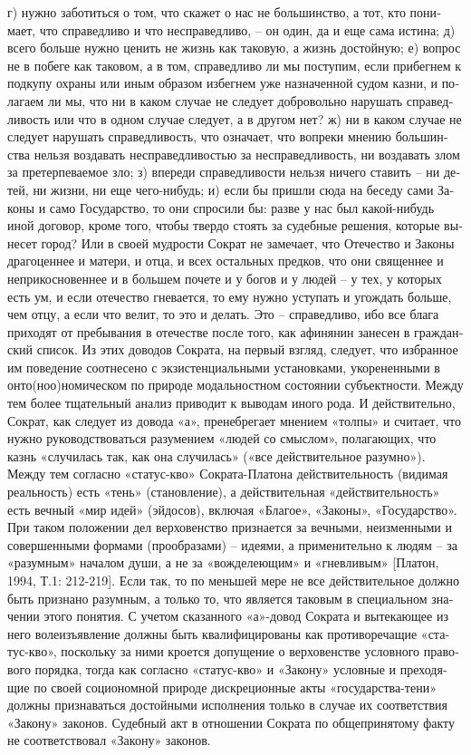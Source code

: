 \begin{russian}
    г) нужно заботиться о том, что скажет о нас не большинство, а тот, кто понимает, что справедливо и что несправедливо, – он один, да и еще сама истина;
    д) всего больше нужно ценить не жизнь как таковую, а жизнь достойную;
    е) вопрос не в побеге как таковом, а в том, справедливо ли мы поступим, если прибегнем к подкупу охраны или иным образом избегнем уже назначенной судом казни, и полагаем ли мы, что ни в каком случае не следует добровольно нарушать справедливость или что в одном случае следует, а в другом нет?
    ж) ни в каком случае не следует нарушать справедливость, что означает, что вопреки мнению большинства нельзя воздавать несправедливостью за несправедливость, ни воздавать злом за претерпеваемое зло;
    з) впереди справедливости нельзя ничего ставить – ни детей, ни жизни, ни еще чего-нибудь;
    и) если бы пришли сюда на беседу сами Законы и само Государство, то они спросили бы: разве у нас был какой-нибудь иной договор, кроме того, чтобы твердо стоять за судебные решения, которые вынесет город? Или в своей мудрости  Сократ не замечает, что Отечество и Законы драгоценнее и матери, и отца, и всех остальных предков, что они священнее и неприкосновеннее и в большем почете и у богов и у людей – у тех, у которых есть ум, и если отечество гневается, то ему нужно уступать и угождать больше, чем отцу, а если что велит, то это и  делать. Это – справедливо, ибо все блага приходят от пребывания в отечестве после того, как афинянин занесен в гражданский список.
    Из этих доводов Сократа, на первый взгляд, следует, что избранное им поведение соотнесено с экзистенциальными установками, укорененными в онто(ноо)номическом по природе модальностном состоянии субъектности.    
    Между тем более тщательный анализ приводит к выводам иного рода.
    И действительно, Сократ, как следует из довода «а», пренебрегает мнением «толпы» и считает, что нужно руководствоваться разумением «людей со смыслом», полагающих, что казнь «случилась так, как она случилась» («все действительное разумно»). Между тем согласно «статус-кво» Сократа-Платона действительность (видимая реальность) есть «тень» (становление), а действительная «действительность» есть вечный «мир идей» (эйдосов), включая «Благое», «Законы», «Государство». При таком положении дел верховенство признается за вечными, неизменными и совершенными формами (прообразами) – идеями, а применительно к людям – за «разумным» началом души, а не за «вожделеющим» и «гневливым» [Платон, 1994, Т.1: 212-219]. Если так, то по меньшей мере не все действительное должно быть признано разумным, а только то, что является таковым в специальном значении этого понятия. С учетом сказанного  «а»-довод Сократа и вытекающее из него волеизъявление должны быть квалифицированы как противоречащие «статус-кво», поскольку за ними кроется допущение о верховенстве условного правового порядка, тогда как согласно «статус-кво» и «Закону» условные и преходящие по своей социономной природе дискреционные акты «государства-тени» должны признаваться достойными исполнения только в случае их соответствия «Закону» законов. Судебный акт в отношении Сократа по общепринятому факту не соответствовал «Закону» законов. 

\end{russian}
